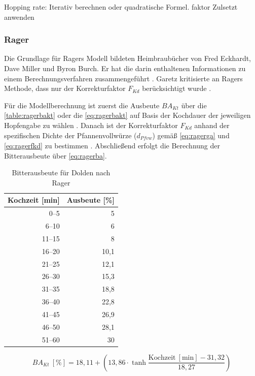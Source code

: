 \documentclass[a4paper,parskip=half]{scrartcl}
\newcommand{\BAKt}{{\mathit{BA}}_{\mathit{Kt}}}
\newcommand{\umin}{\:[\textrm{min}]}
\newcommand{\uper}{\:[\textrm{\%}]}
\newcommand{\FKd}{F_{\mathit{Kd}}}
\newcommand{\dPfvw}{d_\mathit{Pfvw}}
\begin{document}
\parencite[63]{Hall1997}
Hopping rate:
Iterativ berechnen oder quadratische
Formel. 
faktor Zulsetzt anwenden



\subsubsection*{Rager}

Die Grundlage für Ragers Modell bildeten Heimbraubücher von Fred Eckhardt,
Dave Miller und Byron Burch. Er hat die darin enthaltenen Informationen
zu einem Berechnungsverfahren zusammengeführt \parencite[53]{Rager1990}. 
Garetz kritisierte an Ragers Methode, dass nur der Korrekturfaktor
$\FKd$ berücksichtigt wurde \parencite[134]{Garetz1994}.

Für die Modellberechnung ist zuerst die Ausbeute $\BAKt$ über die \autoref{table:ragerbakt}
oder die \autoref{eq:ragerbakt} auf Basis der Kochdauer der jeweiligen Hopfengabe
zu wählen \parencite{Steinmeyer2021}.
Danach ist der Korrekturfaktor $\FKd$ anhand der spezifischen Dichte der
Pfannenvollwürze ($\dPfvw$) gemäß \autoref{eq:ragerga} und \autoref{eq:ragerfkd}
zu bestimmen \parencite[53]{Rager1990}.
Abschließend erfolgt die Berechnung der Bitterausbeute über \autoref{eq:ragerba}.

\begin{table}[H]
\centering
\begin{tabular}{rr}
\toprule
\multicolumn{1}{c}{\textbf{Kochzeit [min]}} & \multicolumn{1}{c}{\textbf{Ausbeute [\%]}} \\
\midrule
0–5             & 5 \\
6–10            & 6 \\
11–15           & 8 \\
16–20           & 10,1 \\
21–25           & 12,1 \\
26–30           & 15,3 \\
31–35           & 18,8 \\
36–40           & 22,8 \\
41–45           & 26,9 \\
46–50           & 28,1 \\
51–60           & 30 \\
\bottomrule
\end{tabular}
\caption{Bitterausbeute für Dolden nach Rager \parencite[54]{Rager1990}}
\label{table:ragerbakt}
\end{table}

\begin{equation}
\BAKt \uper = 18,11 + \left(13,86 \cdot \tanh{\frac{\textrm{Kochzeit} \umin - 31,32}{18,27}}\right)
\label{eq:ragerbakt}
\end{equation}
\end{document}
